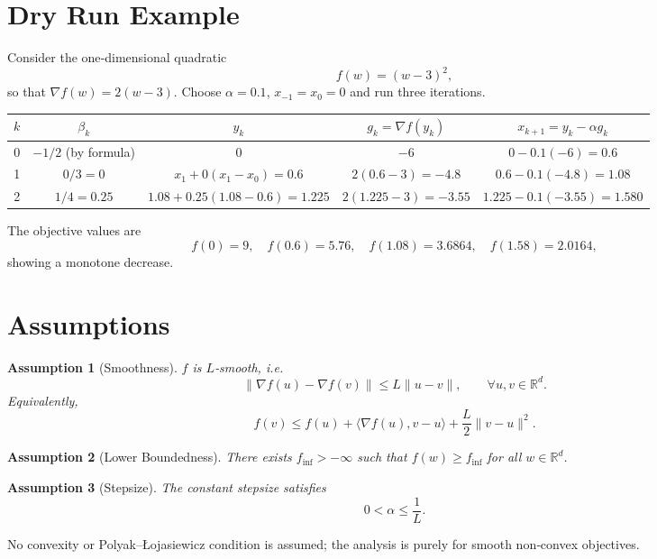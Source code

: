 \documentclass{article}
\newtheorem{assumption}{Assumption}
\newcommand{\R}{\mathbb{R}}
\begin{document}
\section*{Dry Run Example}
Consider the one‑dimensional quadratic
\[
f(w) = (w-3)^2,
\]
so that $\nabla f(w)=2(w-3)$.  
Choose $\alpha = 0.1$, $x_{-1}=x_0=0$ and run three iterations.

\begin{center}
\begin{tabular}{c|c|c|c|c}
$k$ & $\beta_k$ & $y_k$ & $g_k=\nabla f(y_k)$ & $x_{k+1}=y_k-\alpha g_k$\\ \hline
0 & $-1/2$ (by formula) & $0$ & $-6$ & $0-0.1(-6)=0.6$\\[4pt]
1 & $0/3=0$ & $x_1+0(x_1-x_0)=0.6$ & $2(0.6-3)=-4.8$ & $0.6-0.1(-4.8)=1.08$\\[4pt]
2 & $1/4=0.25$ & $1.08+0.25(1.08-0.6)=1.225$ & $2(1.225-3)=-3.55$ &
$1.225-0.1(-3.55)=1.580$\\
\end{tabular}
\end{center}

The objective values are
\[
f(0)=9,\quad f(0.6)=5.76,\quad f(1.08)=3.6864,\quad f(1.58)=2.0164,
\]
showing a monotone decrease.

\section*{Assumptions}
\begin{assumption}[Smoothness]\label{ass:smooth}
$f$ is $L$‑smooth, i.e.
\[
\|\nabla f(u)-\nabla f(v)\| \le L\|u-v\|,\qquad\forall u,v\in\R^d .
\]
Equivalently,
\[
f(v)\le f(u)+\langle\nabla f(u),v-u\rangle+\frac{L}{2}\|v-u\|^2 .
\]
\end{assumption}
\begin{assumption}[Lower Boundedness]\label{ass:lb}
There exists $f_{\inf}>-\infty$ such that $f(w)\ge f_{\inf}$ for all $w\in\R^d$.
\end{assumption}
\begin{assumption}[Stepsize]\label{ass:step}
The constant stepsize satisfies
\[
0<\alpha \le \frac{1}{L}.
\]
\end{assumption}
No convexity or Polyak–Łojasiewicz condition is assumed; the analysis is
purely for smooth non‑convex objectives.

\end{document}
